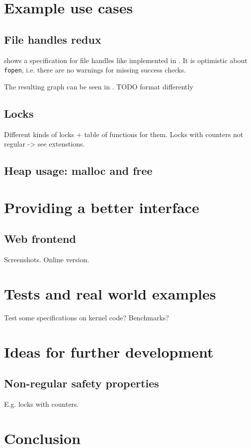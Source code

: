 \chapter{Example use cases}

\section{File handles redux}
 shows a specification for file handles like implemented in . It is optimistic about \verb|fopen|, i.e. there are no warnings for missing success checks.

The resulting graph can be seen in . %
TODO format differently
\begin{landscape}
\end{landscape}

\section{Locks}
Different kinds of locks + table of functions for them.
Locks with counters not regular -> see extenstions.

\section{Heap usage: malloc and free}


\chapter{Providing a better interface}
\section{Web frontend}
Screenshots.
Online version.


\chapter{Tests and real world examples}
Test some specifications on kernel code?
Benchmarks?


\chapter{Ideas for further development}
\section{Non-regular safety properties}
E.g. locks with counters.


\chapter{Conclusion}

